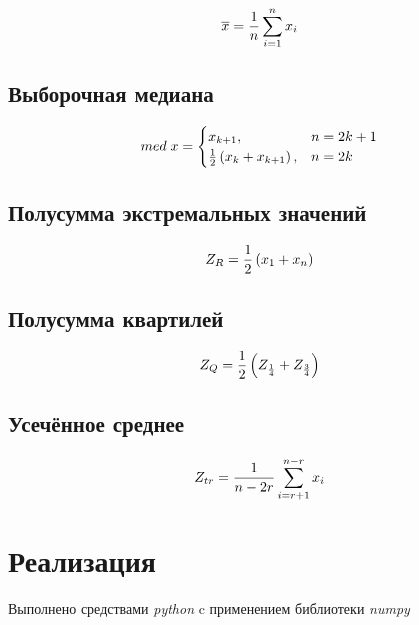 \documentclass[12pt]{article}
\begin{document}
\begin{equation}
\overline{x} = \frac{1}{n}\sum_{i=1}^n x_i \hfill \label{eqn:average}
\end{equation}

\subsection{Выборочная медиана \cite{med}}

\begin{equation}
med\; x = \begin{cases}
x_{k+1}, & n = 2k+1\\
\frac{1}{2}\left(x_k+x_{k+1}\right), & n = 2k
\end{cases} \hfill  \label{eqn:med}
\end{equation}

\subsection{Полусумма экстремальных значений \cite{mean_extr}}

\begin{equation} 
Z_R = \frac{1}{2}\left(x_1+x_n\right) \hfill  \label{eqn:mean_extr}
\end{equation}

\subsection{Полусумма квартилей \cite{quartiles}}

\begin{equation}
Z_Q = \frac{1}{2}\left(Z_{\frac{1}{4}}+Z_{\frac{3}{4}}\right) \hfill  
\label{eqn:quartiles}
\end{equation}

\subsection{Усечённое среднее \cite{cut_mean}}

\begin{equation}
Z_{tr} = \frac{1}{n - 2r}\sum_{i=r+1}^{n-r} x_i \hfill  \label{eqn:cut_mean}
\end{equation}

\pagebreak

\section{Реализация}
Выполнено средствами \textit{python} c применением библиотеки \textit{numpy}\cite{numpy}
\end{document}
